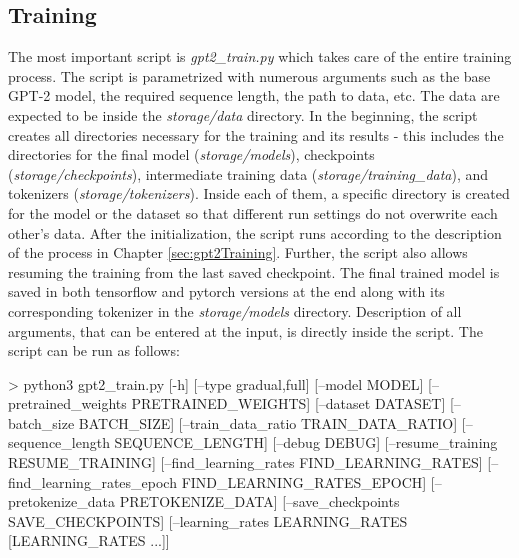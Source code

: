 \subsection*{Training}
The most important script is \textit{gpt2\_train.py} which takes care of the entire training process. The script is parametrized with numerous arguments such as the base GPT-2 model, the required sequence length, the path to data, etc. The data are expected to be inside the \textit{storage/data} directory. In the beginning, the script creates all directories necessary for the training and its results - this includes the directories for the final model (\textit{storage/models}), checkpoints (\textit{storage/checkpoints}), intermediate training data (\textit{storage/training\_data}), and tokenizers (\textit{storage/tokenizers}). Inside each of them, a specific directory is created for the model or the dataset so that different run settings do not overwrite each other's data. After the initialization, the script runs according to the description of the process in Chapter \ref{sec:gpt2Training}. Further, the script also allows resuming the training from the last saved checkpoint. The final trained model is saved in both tensorflow and pytorch versions at the end along with its corresponding tokenizer in the \textit{storage/models} directory. Description of all arguments, that can be entered at the input, is directly inside the script. The script can be run as follows:
\newpage
\begin{code}
> python3 gpt2_train.py [-h] [--type {gradual,full}] 
              [--model MODEL]
              [--pretrained_weights PRETRAINED_WEIGHTS] 
              [--dataset DATASET] 
              [--batch_size BATCH_SIZE]
              [--train_data_ratio TRAIN_DATA_RATIO] 
              [--sequence_length SEQUENCE_LENGTH] [--debug DEBUG] 
              [--resume_training RESUME_TRAINING] 
              [--find_learning_rates FIND_LEARNING_RATES]
              [--find_learning_rates_epoch FIND_LEARNING_RATES_EPOCH]
              [--pretokenize_data PRETOKENIZE_DATA] 
              [--save_checkpoints SAVE_CHECKPOINTS] 
              [--learning_rates LEARNING_RATES [LEARNING_RATES ...]]
\end{code}

